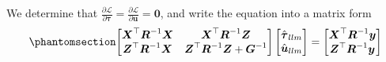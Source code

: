\documentclass[
  a4paper,
  oneside,
  openany,
  12pt,
  onecolumn]{book}
\theoremstyle{plain}
\theoremstyle{definition}
\theoremstyle{remark}
\begin{document}
We determine that
\(\frac{\partial\mathscr{L}}{\partial\boldsymbol{\tau}}=\frac{\partial\mathscr{L}}{\partial\boldsymbol{u}}=\boldsymbol{0}\),
and write the equation into a matrix form
\begin{equation}\phantomsection\label{eq-ll}{
\begin{bmatrix}
\boldsymbol{X}^\top\boldsymbol{R}^{-1}\boldsymbol{X} & \boldsymbol{X}^\top\boldsymbol{R}^{-1}\boldsymbol{Z}\\
\boldsymbol{Z}^\top\boldsymbol{R}^{-1}\boldsymbol{X} & \boldsymbol{Z}^\top\boldsymbol{R}^{-1}\boldsymbol{Z}+ \boldsymbol{G}^{-1}
\end{bmatrix}
\begin{bmatrix}
\hat{\boldsymbol{\tau}}_{llm}\\
\hat{\boldsymbol{u}}_{llm}
\end{bmatrix}=
\begin{bmatrix}
\boldsymbol{X}^\top\boldsymbol{R}^{-1}\boldsymbol{y}\\
\boldsymbol{Z}^\top\boldsymbol{R}^{-1}\boldsymbol{y}
\end{bmatrix}
}\end{equation}
\end{document}
